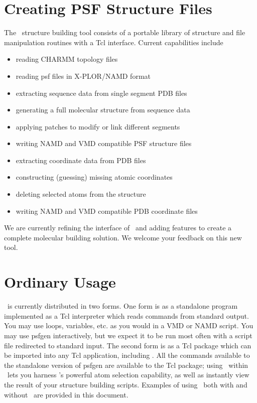 \section{Creating PSF Structure Files}
\label{section:psfgen}

The \PSFGEN\ structure building tool consists of a portable library
of structure and file manipulation routines with a Tcl interface.
Current capabilities include
\begin{itemize}
\item reading CHARMM topology files
\item reading psf files in X-PLOR/NAMD format
\item extracting sequence data from single segment PDB files
\item generating a full molecular structure from sequence data
\item applying patches to modify or link different segments
\item writing NAMD and VMD compatible PSF structure files
\item extracting coordinate data from PDB files
\item constructing (guessing) missing atomic coordinates
\item deleting selected atoms from the structure
\item writing NAMD and VMD compatible PDB coordinate files
\end{itemize}

We are currently refining the interface of \PSFGEN\ and adding
features to create a complete molecular building solution.
We welcome your feedback on this new tool.

\section{Ordinary Usage}

\PSFGEN\ is currently distributed in two forms.  One form is as a standalone
program implemented as a Tcl interpreter which reads
commands from standard output.  You may use loops, variables, etc. as
you would in a VMD or NAMD script.  You may use psfgen interactively,
but we expect it to be run most often with a script file redirected to
standard input.  The second form is as a Tcl package which can be imported
into any Tcl application, including \VMD.  All the commands available to the
standalone version of psfgen are available to the Tcl package; using \PSFGEN\
within \VMD\ lets you harness \VMD's powerful atom selection capability, as well
as instantly view the result of your structure building scripts.  Examples
of using \PSFGEN\ both with and without \VMD\ are provided in this document.

